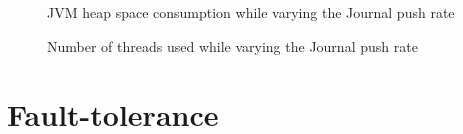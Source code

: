 \begin{figure}
  \begin{center} 
    \caption{JVM heap space consumption while varying the Journal push rate}
    \label{fig:plotheapspace}
  \end{center}
\end{figure}

\begin{figure}
  \begin{center} 
    \caption{Number of threads used while varying the Journal push rate}
    \label{fig:plotthreads}
  \end{center}
\end{figure}


\section{Fault-tolerance}

